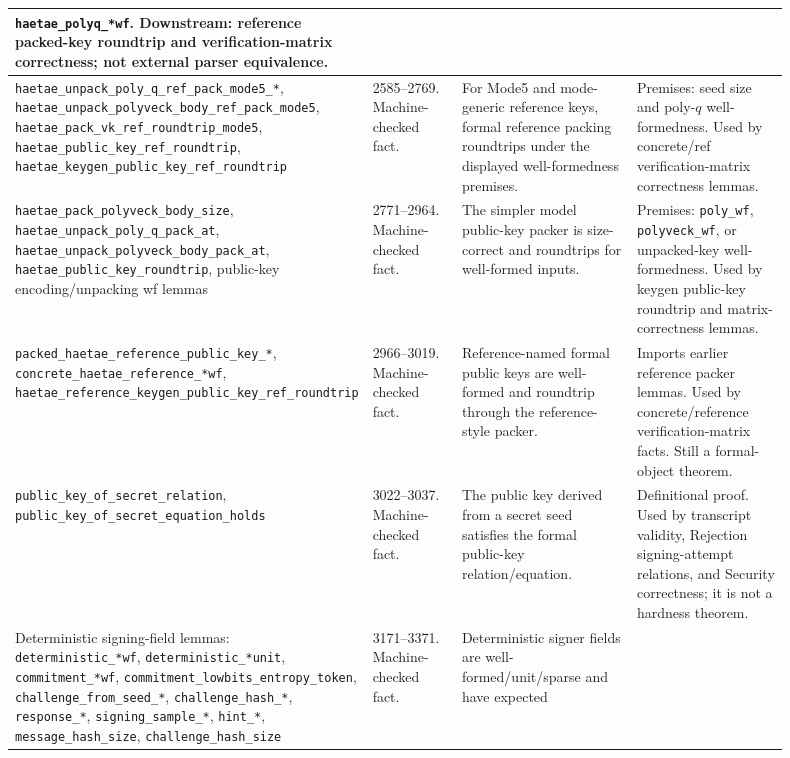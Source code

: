 \documentclass[11pt]{report}
\DeclareRobustCommand{\ec}[1]{\ifmmode\text{\nolinkurl{#1}}\else\nolinkurl{#1}\fi}
\theoremstyle{definition}
\theoremstyle{plain}
\begin{document}
{\begin{longtable}{p{0.25\linewidth}p{0.14\linewidth}p{0.28\linewidth}p{0.23\linewidth}}
\ec{haetae\_polyq\_*wf}.  Downstream: reference packed-key roundtrip and
verification-matrix correctness; not external parser equivalence. \\
\midrule
\ec{haetae\_unpack\_poly\_q\_ref\_pack\_mode5\_*},
\ec{haetae\_unpack\_polyveck\_body\_ref\_pack\_mode5},
\ec{haetae\_pack\_vk\_ref\_roundtrip\_mode5},
\ec{haetae\_public\_key\_ref\_roundtrip},
\ec{haetae\_keygen\_public\_key\_ref\_roundtrip} &
2585--2769. Machine-checked fact. &
For Mode5 and mode-generic reference keys, formal reference packing roundtrips
under the displayed well-formedness premises. &
Premises: seed size and poly-\(q\) well-formedness.  Used by concrete/ref
verification-matrix correctness lemmas. \\
\midrule
\ec{haetae\_pack\_polyveck\_body\_size},
\ec{haetae\_unpack\_poly\_q\_pack\_at},
\ec{haetae\_unpack\_polyveck\_body\_pack\_at},
\ec{haetae\_public\_key\_roundtrip}, public-key encoding/unpacking wf lemmas &
2771--2964. Machine-checked fact. &
The simpler model public-key packer is size-correct and roundtrips for
well-formed inputs. &
Premises: \ec{poly\_wf}, \ec{polyveck\_wf}, or unpacked-key well-formedness.
Used by keygen public-key roundtrip and matrix-correctness lemmas. \\
\midrule
\ec{packed\_haetae\_reference\_public\_key\_*},
\ec{concrete\_haetae\_reference\_*wf},
\ec{haetae\_reference\_keygen\_public\_key\_ref\_roundtrip} &
2966--3019. Machine-checked fact. &
Reference-named formal public keys are well-formed and roundtrip through the
reference-style packer. &
Imports earlier reference packer lemmas.  Used by concrete/reference
verification-matrix facts.  Still a formal-object theorem. \\
\midrule
\ec{public\_key\_of\_secret\_relation},
\ec{public\_key\_of\_secret\_equation\_holds} &
3022--3037. Machine-checked fact. &
The public key derived from a secret seed satisfies the formal public-key
relation/equation. &
Definitional proof.  Used by transcript validity, Rejection signing-attempt
relations, and Security correctness; it is not a hardness theorem. \\
\midrule
Deterministic signing-field lemmas:
\ec{deterministic\_*wf}, \ec{deterministic\_*unit},
\ec{commitment\_*wf}, \ec{commitment\_lowbits\_entropy\_token},
\ec{challenge\_from\_seed\_*}, \ec{challenge\_hash\_*},
\ec{response\_*}, \ec{signing\_sample\_*}, \ec{hint\_*},
\ec{message\_hash\_size}, \ec{challenge\_hash\_size} &
3171--3371. Machine-checked fact. &
Deterministic signer fields are well-formed/unit/sparse and have expected

\end{longtable}}
\end{document}
